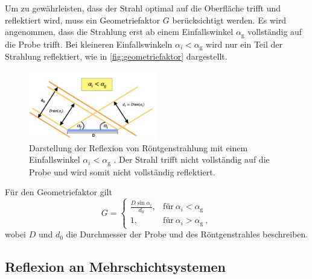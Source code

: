 Um zu gewährleisten,
dass der Strahl optimal auf die Oberfläche trifft und reflektiert wird,
muss ein Geometriefaktor $G$ berücksichtigt werden.
Es wird angenommen,
dass die Strahlung erst ab einem Einfallswinkel $\alpha_\text{g}$ vollständig auf die Probe trifft.
Bei kleineren Einfallswinkeln $\alpha_i < \alpha_\text{g}$ wird nur ein Teil der Strahlung reflektiert,
wie in \autoref{fig:geometriefaktor} dargestellt.
\begin{figure}
    \centering
    \includegraphics[width=0.5\textwidth]{content/img/Abb_7.png}
    \caption{Darstellung der Reflexion von Röntgenstrahlung mit einem Einfallswinkel $\alpha_i < \alpha_\text{g}$ \cite{versuchsanleitung}.
    Der Strahl trifft nicht vollständig auf die Probe und wird somit nicht vollständig reflektiert.}
    \label{fig:geometriefaktor}
\end{figure}
Für den Geometriefaktor gilt
\begin{equation}
    G =
    \begin{cases}
        \frac{D \sin{\alpha_i}}{d_0}, &\text{für} \ \alpha_i < \alpha_\text{g} \\
        1                           , &\text{für} \ \alpha_i > \alpha_\text{g} \ ,
    \end{cases}
    \label{eqn:geometriefaktor}
\end{equation}
wobei $D$ und $d_0$ die Durchmesser der Probe und des Röntgenstrahles beschreiben.


\subsection{Reflexion an Mehrschichtsystemen}

